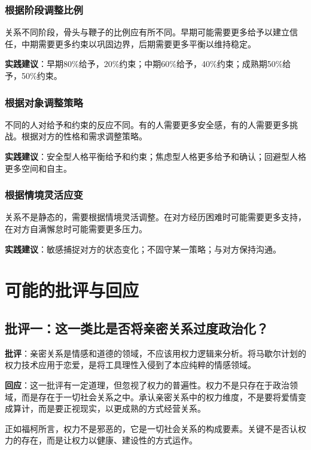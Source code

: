 \documentclass[12pt,a4paper]{article}
\begin{document}
\subsubsection{根据阶段调整比例}

关系不同阶段，骨头与鞭子的比例应有所不同。早期可能需要更多给予以建立信任，中期需要更多约束以巩固边界，后期需要更多平衡以维持稳定。

\textbf{实践建议}：早期80\%给予，20\%约束；中期60\%给予，40\%约束；成熟期50\%给予，50\%约束。

\subsubsection{根据对象调整策略}

不同的人对给予和约束的反应不同。有的人需要更多安全感，有的人需要更多挑战。根据对方的性格和需求调整策略。

\textbf{实践建议}：安全型人格平衡给予和约束；焦虑型人格更多给予和确认；回避型人格更多空间和自主。

\subsubsection{根据情境灵活应变}

关系不是静态的，需要根据情境灵活调整。在对方经历困难时可能需要更多支持，在对方自满懈怠时可能需要更多压力。

\textbf{实践建议}：敏感捕捉对方的状态变化；不固守某一策略；与对方保持沟通。

\section{可能的批评与回应}

\subsection{批评一：这一类比是否将亲密关系过度政治化？}

\textbf{批评}：亲密关系是情感和道德的领域，不应该用权力逻辑来分析。将马歇尔计划的权力技术应用于恋爱，是将工具理性入侵到了本应纯粹的情感领域。

\textbf{回应}：这一批评有一定道理，但忽视了权力的普遍性。权力不是只存在于政治领域，而是存在于一切社会关系之中。承认亲密关系中的权力维度，不是要将爱情变成算计，而是要正视现实，以更成熟的方式经营关系。

正如福柯所言，权力不是邪恶的，它是一切社会关系的构成要素。关键不是否认权力的存在，而是让权力以健康、建设性的方式运作。
\end{document}
